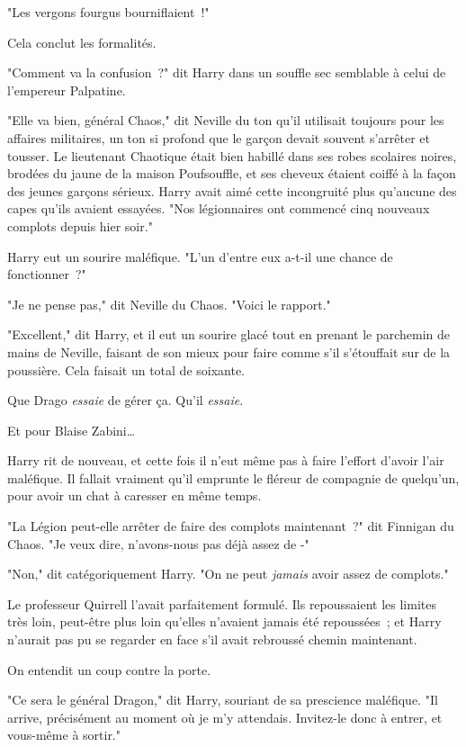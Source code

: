 "Les vergons fourgus bourniflaient~!"

Cela conclut les formalités.

"Comment va la confusion~?" dit Harry dans un souffle sec semblable à celui de l'empereur Palpatine.

"Elle va bien, général Chaos," dit Neville du ton qu'il utilisait toujours pour les affaires militaires, un ton si profond que le garçon devait souvent s'arrêter et tousser. Le lieutenant Chaotique était bien habillé dans ses robes scolaires noires, brodées du jaune de la maison Poufsouffle, et ses cheveux étaient coiffé à la façon des jeunes garçons sérieux. Harry avait aimé cette incongruité plus qu'aucune des capes qu'ils avaient essayées. "Nos légionnaires ont commencé cinq nouveaux complots depuis hier soir."

Harry eut un sourire maléfique. "L'un d'entre eux a-t-il une chance de fonctionner~?"

"Je ne pense pas," dit Neville du Chaos. "Voici le rapport."

"Excellent," dit Harry, et il eut un sourire glacé tout en prenant le parchemin de mains de Neville, faisant de son mieux pour faire comme s'il s'étouffait sur de la poussière. Cela faisait un total de soixante.

Que Drago \emph{essaie} de gérer ça. Qu'il \emph{essaie}.

Et pour Blaise Zabini…

Harry rit de nouveau, et cette fois il n'eut même pas à faire l'effort d'avoir l'air maléfique. Il fallait vraiment qu'il emprunte le fléreur de compagnie de quelqu'un, pour avoir un chat à caresser en même temps.

"La Légion peut-elle arrêter de faire des complots maintenant~?" dit Finnigan du Chaos. "Je veux dire, n'avons-nous pas déjà assez de -"

"Non," dit catégoriquement Harry. "On ne peut \emph{jamais} avoir assez de complots."

Le professeur Quirrell l'avait parfaitement formulé. Ils repoussaient les limites très loin, peut-être plus loin qu'elles n'avaient jamais été repoussées~; et Harry n'aurait pas pu se regarder en face s'il avait rebroussé chemin maintenant.

On entendit un coup contre la porte.

"Ce sera le général Dragon," dit Harry, souriant de sa prescience maléfique. "Il arrive, précisément au moment où je m'y attendais. Invitez-le donc à entrer, et vous-même à sortir."

